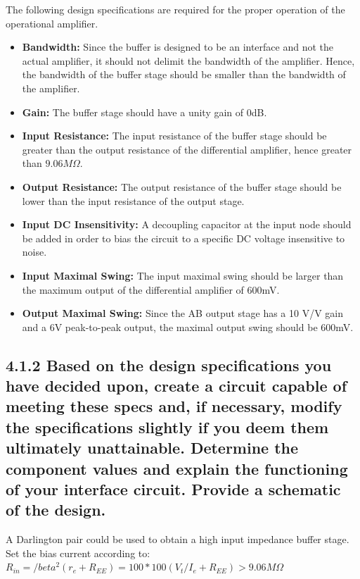 \documentclass[12pt]{article}
\begin{document}
The following design specifications are required for the proper operation of the operational amplifier.


\begin{itemize}
    \item \textbf{Bandwidth:} Since the buffer is designed to be an interface and not the actual amplifier, it should not delimit the bandwidth of the amplifier. 
    Hence, the bandwidth of the buffer stage should be smaller than the bandwidth of the amplifier. 
    \item \textbf{Gain:} The buffer stage should have a unity gain of 0dB.
    \item \textbf{Input Resistance:} The input resistance of the buffer stage should be greater than the output resistance of the differential amplifier, hence greater than $9.06M \Omega$.
    \item \textbf{Output Resistance:} The output resistance of the buffer stage should be lower than the input resistance of the output stage.
    \item \textbf{Input DC Insensitivity:} A decoupling capacitor at the input node should be added in order to bias the circuit to a specific DC voltage insensitive to noise.
    \item \textbf{Input Maximal Swing:} The input maximal swing should be larger than the maximum output of the differential amplifier of 600mV.
    \item \textbf{Output Maximal Swing:} Since the AB output stage has a 10 V/V gain and a 6V peak-to-peak output, the maximal output swing should be 600mV.
\end{itemize}

\subsection*{4.1.2 Based on the design specifications you have decided upon, create a circuit 
capable of meeting these specs and, if necessary, modify the specifications slightly if you deem 
them ultimately unattainable. Determine the component values and explain the functioning of your 
interface circuit. Provide a schematic of the design. }

A Darlington pair could be used to obtain a high input impedance buffer stage. \\

Set the bias current according to: \\

$R_{in} = /beta^2 (r_e + R_{EE}) = 100 * 100 (V_t / I_e + R_{EE}) > 9.06M \Omega$ \\ 
\end{document}
